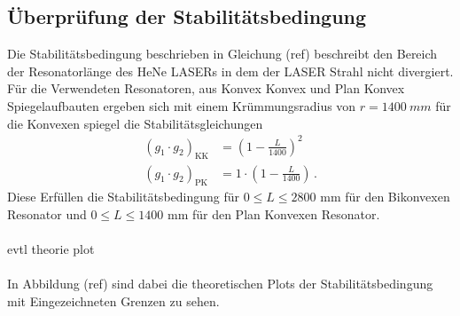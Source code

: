 \subsection{Überprüfung der Stabilitätsbedingung}
Die Stabilitätsbedingung beschrieben in Gleichung (ref) beschreibt den Bereich der Resonatorlänge des HeNe LASERs in dem der LASER Strahl nicht divergiert. 
Für die Verwendeten Resonatoren, aus Konvex Konvex und Plan Konvex Spiegelaufbauten ergeben sich mit einem Krümmungsradius von $r = \SI{1400}{mm}$ für die Konvexen spiegel die Stabilitätsgleichungen
\begin{align}
  \left(g_1 \cdot g_2\right)_{\text{KK}} &= \left( 1 - \frac{L}{1400} \right)^2 \\
  \left(g_1 \cdot g_2\right)_{\text{PK}} &= 1 \cdot \left( 1 - \frac{L}{1400} \right) \, .
\end{align}
Diese Erfüllen die Stabilitätsbedingung für $0 \leq L \leq 2800 \, \, \mathrm{mm}$ für den Bikonvexen Resonator und $0 \leq L \leq 1400 \, \, \mathrm{mm}$ für den Plan Konvexen Resonator.
\\
\\
evtl theorie plot 
\\
\\
In Abbildung (ref) sind dabei die theoretischen Plots der Stabilitätsbedingung mit Eingezeichneten Grenzen zu sehen. 
